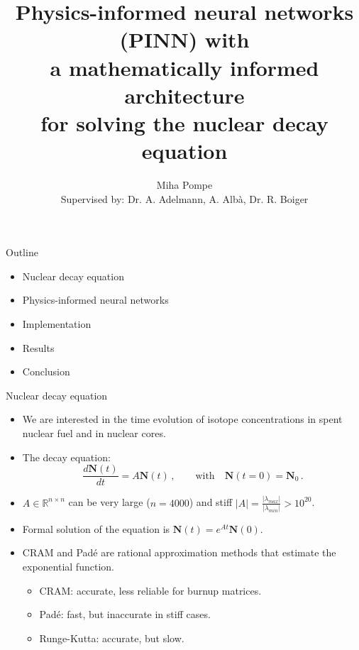 \documentclass[9pt]{beamer}
\title{Physics-informed neural networks (PINN) with \\a mathematically informed architecture \\for solving the nuclear decay equation}
\date{}
\author{Miha Pompe\\Supervised by: Dr. A. Adelmann, A. Alb\`a, Dr. R. Boiger}
\begin{document}
\maketitle

\begin{frame}[fragile]{Outline}
\begin{itemize}
    \item Nuclear decay equation
    \item Physics-informed neural networks
    \item Implementation
    \item Results
    \item Conclusion
\end{itemize}
\end{frame}


\begin{frame}[fragile]{Nuclear decay equation}
\begin{itemize}
    \item We are interested in the time evolution of isotope concentrations in spent nuclear fuel and in nuclear cores.
    \item The decay equation:
    \begin{equation*}\label{eq:decay_eq}
        \frac{d\mathbf{N}(t)}{dt} = A \mathbf{N}(t) \,,\qquad \text{with} \quad \mathbf{N}(t=0) = \mathbf{N}_0 \,.
    \end{equation*}
    \item $A \in \mathbb{R}^{n \times n}$ can be very large ($n = 4000$) and stiff $|A| = \frac{|\lambda_{max}|}{|\lambda_{min}|} > 10^{20}$.
    \item Formal solution of the equation is $\mathbf{N}(t) = e^{At}\mathbf{N}(0)$\footnotemark.
    \item CRAM and Pad\'e are rational approximation methods that estimate the exponential function\footnotemark.
    \begin{itemize}
        \item CRAM: accurate, less reliable for burnup matrices.
        \item Pad\'e: fast, but inaccurate in stiff cases.
        \item Runge-Kutta: accurate, but slow. 
    \end{itemize}
\end{itemize}
\end{frame}
\end{document}
